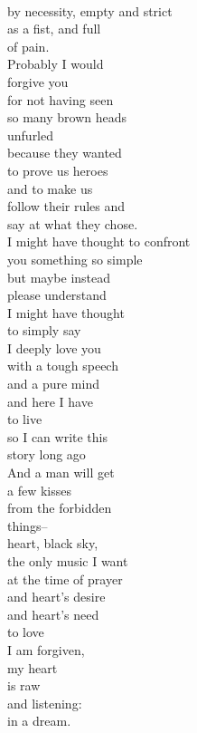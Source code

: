 \documentclass[smalldemyvopaper,11pt,twoside,onecolumn,openright,extrafontsizes]{memoir}
\begin{document}
\\by necessity, empty and strict
\\as a fist, and full
\\of pain.
\\Probably I would
\\forgive you
\\for not having seen
\\so many brown heads
\\unfurled
\\because they wanted
\\to prove us heroes
\\and to make us
\\follow their rules and
\\say at what they chose.
\\I might have thought to confront
\\you something so simple
\\but maybe instead
\\please understand
\\I might have thought
\\to simply say
\\I deeply love you
\\with a tough speech
\\and a pure mind
\\and here I have
\\to live
\\so I can write this
\\story long ago
\\And a man will get
\\a few kisses
\\from the forbidden
\\things--
\\heart, black sky,
\\the only music I want
\\at the time of prayer
\\and heart's desire
\\and heart's need
\\to love
\\I am forgiven,
\\my heart
\\is raw
\\and listening:
\\in a dream.
\end{document}
